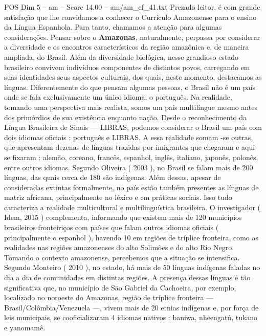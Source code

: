 \begin{textsample}{POS Dim 5 – am – Score 14.00 – am/am\_ef\_41.txt}  \label{ex:f5_pos_062}
Prezado leitor, é com grande satisfação que lhe convidamos a conhecer o Currículo Amazonense para o ensino da Língua Espanhola.
Para tanto, chamamos a atenção para algumas considerações.
Pensar sobre o \textbf{Amazonas}, naturalmente, perpassa por considerar a diversidade e os encontros característicos da região amazônica e, de maneira ampliada, do Brasil.
Além da diversidade biológica, nesse grandioso estado brasileiro convivem indivíduos componentes de distintos povos, carregando em suas identidades seus aspectos culturais, dos quais, neste momento, destacamos as línguas.
Diferentemente do que pensam algumas pessoas, o Brasil não é um país onde se fala exclusivamente um único idioma, o português.
Na realidade, tomando uma perspectiva mais realista, somos um país multilíngue mesmo antes dos primórdios de sua existência enquanto nação.
Desde o reconhecimento da Língua Brasileira de Sinais — LIBRAS, podemos considerar o Brasil um país com dois idiomas oficiais : português e LIBRAS.
A essa realidade somam -se outras, que apresentam dezenas de línguas trazidas por imigrantes que chegaram e aqui se fixaram : alemão, coreano, francês, espanhol, inglês, italiano, japonês, polonês, entre outros idiomas.
Segundo Oliveira ( 2003 ), no Brasil se falam mais de 200 línguas, das quais cerca de 180 são indígenas.
Além dessas, apesar de consideradas extintas formalmente, no país estão também presentes as línguas de matriz africana, principalmente no léxico e em práticas sociais.
Isso tudo caracteriza a realidade multicultural e multilinguística brasileira.
O investigador ( Idem, 2015 ) complementa, informando que existem mais de 120 municípios brasileiros fronteiriços com países que falam outros idiomas oficiais ( principalmente o espanhol ), havendo 10 em regiões de tríplice fronteira, como as realidades nas regiões amazonenses do alto Solimões e do alto Rio Negro.
Tomando o contexto amazonense, percebemos que a situação se intensifica.
Segundo Monteiro ( 2010 ), no estado, há mais de 50 línguas indígenas faladas no dia a dia de comunidades em distintas regiões.
A presença dessas línguas é tão significativa que, no município de São Gabriel da Cachoeira, por exemplo, localizado no noroeste do Amazonas, região de tríplice fronteira — Brasil/Colômbia/Venezuela —, vivem mais de 20 etnias indígenas e, por força de leis municipais, se cooficializaram 4 idiomas nativos : baniwa, nheengatú, tukano e yanomamê.

\end{textsample}
